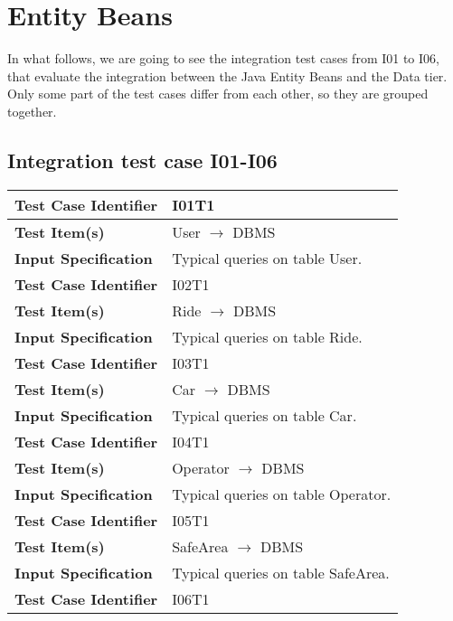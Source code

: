 \section{Entity Beans}

In what follows, we are going to see the integration test cases from I01 to I06, that evaluate the integration between the Java Entity Beans and the Data tier.
Only some part of the test cases differ from each other, so they are grouped together.

\subsection{Integration test case I01-I06}

\begin{tabular}{l p{}}
    \hline
    \textbf{Test Case Identifier} & I01T1\\
    \hline
    \textbf{Test Item(s)} & User $\rightarrow$ DBMS \\
    \hline
    \textbf{Input Specification} & Typical queries on table User. \\
    \hline
    \hline
    \textbf{Test Case Identifier} & I02T1\\
    \hline
    \textbf{Test Item(s)} & Ride $\rightarrow$ DBMS \\
    \hline
    \textbf{Input Specification} & Typical queries on table Ride. \\
    \hline
    \hline
    \textbf{Test Case Identifier} & I03T1\\
    \hline
    \textbf{Test Item(s)} & Car $\rightarrow$ DBMS \\
    \hline
    \textbf{Input Specification} & Typical queries on table Car. \\
    \hline
    \hline
    \textbf{Test Case Identifier} & I04T1\\
    \hline
    \textbf{Test Item(s)} & Operator $\rightarrow$ DBMS \\
    \hline
    \textbf{Input Specification} & Typical queries on table Operator. \\
    \hline
    \hline
    \textbf{Test Case Identifier} & I05T1\\
    \hline
    \textbf{Test Item(s)} & SafeArea $\rightarrow$ DBMS \\
    \hline
    \textbf{Input Specification} & Typical queries on table SafeArea. \\
    \hline
    \hline
    \textbf{Test Case Identifier} & I06T1\\

\end{tabular}
